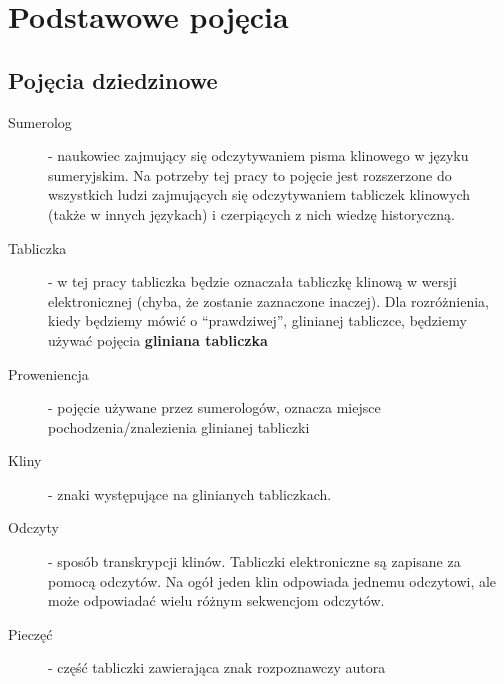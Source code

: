 \chapter{Podstawowe pojęcia}\label{r:pojecia}
\section{Pojęcia dziedzinowe}
\begin{description}
 \item[Sumerolog] - naukowiec zajmujący się odczytywaniem pisma klinowego w języku sumeryjskim. Na potrzeby tej pracy
		      to pojęcie jest rozszerzone do wszystkich ludzi zajmujących się odczytywaniem tabliczek klinowych (także w innych językach) i czerpiących z nich wiedzę historyczną.
 \item[Tabliczka] - w tej pracy tabliczka będzie oznaczała tabliczkę klinową w wersji elektronicznej 
		  (chyba, że zostanie zaznaczone inaczej). Dla rozróżnienia, kiedy będziemy mówić o ``prawdziwej'', 
		  glinianej tabliczce, będziemy używać pojęcia \textbf{gliniana tabliczka}
 \item[Proweniencja] - pojęcie używane przez sumerologów, oznacza miejsce pochodzenia/znalezienia glinianej tabliczki
 \item[Kliny] - znaki występujące na glinianych tabliczkach.
 \item[Odczyty] - sposób transkrypcji klinów. Tabliczki elektroniczne są zapisane za pomocą odczytów. Na ogół jeden klin odpowiada jednemu odczytowi, ale może odpowiadać wielu różnym sekwencjom odczytów.
 \item[Pieczęć] - część tabliczki zawierająca znak rozpoznawczy autora
\end{description}

